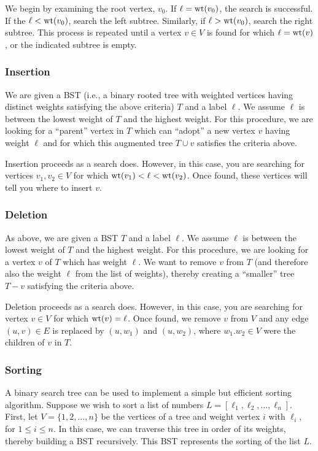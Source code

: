 We begin by examining the root vertex, $v_0$. If $\ell={\rm wt}(v_0)$,
the search is successful. If the $\ell<{\rm wt}(v_0)$,
search the left subtree. Similarly, if $\ell>{\rm wt}(v_0)$,
search the right subtree. This process is repeated until a vertex
$v\in V$ is found for which $\ell={\rm wt}(v)$,
or the indicated subtree is empty.


\subsubsection{Insertion}

We are given a BST (i.e., a binary rooted tree with weighted vertices
having distinct weights satisfying the above criteria) $T$ and a
label $\ell$. We assume $\ell$ is between the
lowest weight of $T$ and the highest weight.
For this procedure, we are looking for a ``parent''
vertex in $T$ which can ``adopt'' a new vertex $v$ having weight $\ell$
and for which this augmented tree $T\cup v$ satisfies
the criteria above.

Insertion proceeds as a search does. However, in this case, you are
searching for vertices $v_1,v_2\in V$ for which
${\rm wt}(v_1)<\ell < {\rm wt}(v_2)$. Once found, these
vertices will tell you where to insert $v$.

\subsubsection{Deletion}

As above, we are given a BST $T$ and a
label $\ell$. We assume $\ell$ is between the
lowest weight of $T$ and the highest weight.
For this procedure, we are looking for a vertex $v$ of
$T$ which has weight $\ell$. We want to remove $v$ from
$T$ (and therefore also the weight $\ell$ from the list of weights),
thereby creating a ``smaller'' tree $T- v$ satisfying
the criteria above.

Deletion proceeds as a search does. However, in this case, you are
searching for vertex $v\in V$ for which
${\rm wt}(v)=\ell$. Once found, we remove $v$ from $V$
and any edge $(u,v)\in E$ is replaced by $(u,w_1)$
and $(u,w_2)$, where $w_1.w_2\in V$ were the children of $v$
in $T$.

\subsubsection{Sorting}

A binary search tree can be used to implement a simple but efficient
sorting algorithm. Suppose we wish to sort a list of numbers
$L = [\ell_1, \ell_2,\dots, \ell_n]$. First, let $V=\{1,2,\dots,n\}$
be the vertices of a tree and weight vertex $i$ with $\ell_i$,
for $1\leq i\leq n$. In this case, we can traverse this tree
in order of its weights, thereby building a BST recursively.
This BST represents the sorting of the list $L$.


